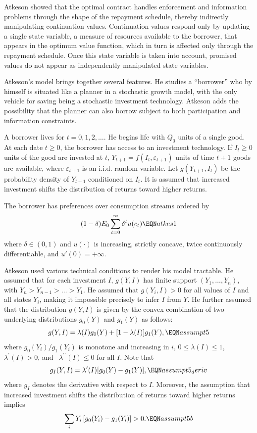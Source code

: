 Atkeson showed that the optimal contract  handles enforcement and information problems
through the shape of the repayment schedule, thereby indirectly manipulating continuation values.
  Continuation values respond only by updating
a single state variable, a measure of resources available to the
borrower, that appears in the optimum value function, which in turn
is affected only through the repayment schedule.  Once this state
variable is taken into account, promised values do not appear as
independently manipulated state variables.

Atkeson's model brings together several features.  He studies
a ``borrower'' who by himself is situated like a planner
in a stochastic growth model, with the only vehicle for saving
being a stochastic investment technology.  Atkeson adds the
possibility that the planner can also borrow
subject to both participation and information constraints.

A borrower lives for $t=0,1,2,\ldots $.  He begins life with $Q_{0}$
units of a single good.  At each date $t\geq 0$, the borrower has access
to an investment technology.  If $I_t\geq 0$ units of the good are
invested at  $t$, $Y_{t+1}=f(I_{t},\varepsilon_{t+1})$
units of time $t+1$  goods are available, where $\varepsilon_{t+1}$ is
an i.i.d. random variable.
  Let  $g(Y_{t+1}, I_{t})$ be the
probability density of  $Y_{t+1}$  conditioned on  $I_{t}$. It is
assumed that increased investment shifts the distribution of returns
toward higher returns.

  The borrower has preferences over consumption streams ordered by
$$  (1-\delta)E_0 \sum_{t=0}^\infty \delta^t u(c_t) \EQN atkes1 $$
\newpage
\noindent where $\delta \in (0,1)$ and $u(\cdot)$ is increasing, strictly concave,
twice continuously differentiable, and $u'(0) = +\infty$.

Atkeson used various technical conditions to render his model
tractable. He assumed that for each investment $I$, $g(Y, I)$
 has finite support  $\left(Y_{1},\ldots, Y_{n}\right)$, with
$Y_n > Y_{n-1} > \ldots >Y_1$.  He assumed that  $g(Y_{i}, I)>0$
  for all values of  $I$ and all states $Y_{i}$, making it
impossible precisely to infer $I$  from $Y$.
He further assumed that the distribution $g\left( Y,  I\right)$
is given by the convex combination of two underlying distributions
$g_0(Y)$ and $g_1(Y)$ as follows:
$$g( Y, I) =\lambda(I) g_{0}(Y)
+[1-\lambda( I) ] g_{1}( Y),  \EQN assumpt5 $$
where $g_{0}(Y_i)/g_1(Y_i) $  is monotone  and increasing
in  $i$,  $0\leq \lambda(I) \leq 1$, $\lambda^{\prime}
\left( I\right) >0$,  and \ $\lambda^{\prime \prime }\left( I\right) \leq
0 $  for all  $I$.   Note that
$$
g_I(Y,I) = \lambda'(I) [g_0(Y) - g_1(Y)],  \EQN assumpt5_deriv
$$
where $g_I$ denotes the derivative with respect to $I$. Moreover,
the assumption that increased investment shifts the distribution
of returns toward higher returns implies
$$
\sum_i Y_i \left[g_0(Y_i) - g_1(Y_i) \right] >0.       \EQN assumpt5b
$$

